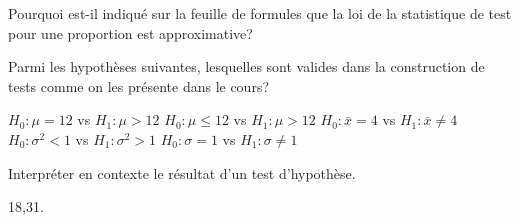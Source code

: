 \begin{questions}
\vspace{1.5cm}
\question[2]
Pourquoi est-il indiqué sur la feuille de formules que la loi de la statistique de test pour une proportion est approximative?

\vspace{3cm}
\question[4]
Parmi les hypothèses suivantes, lesquelles sont valides dans la construction de tests comme on les présente dans le cours?

\begin{checkboxes}
\correctchoice $H_0 : \mu = 12$ vs $H_1 : \mu > 12$
\choice $H_0 : \mu \leq 12$ vs $H_1 : \mu > 12$
\choice $H_0 : \bar{x} = 4$ vs $H_1 : \bar{x} \ne 4$
\choice $H_0 : \sigma^2 < 1$ vs $H_1 : \sigma^2 > 1$
\correctchoice $H_0: \sigma = 1$ vs $H_1: \sigma \neq 1$
\end{checkboxes}
\newpage
\question[4]
Interpréter en contexte le résultat d'un test d'hypothèse. 

\end{questions}

\vspace{1in}
18,31.

 
